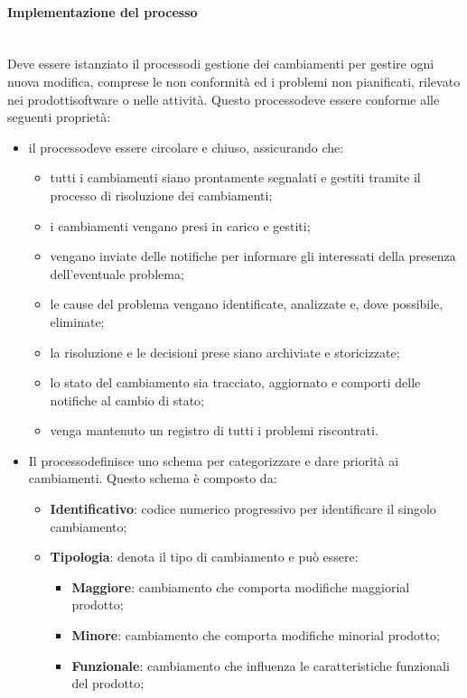 \paragraph{Implementazione del processo}\mbox{}\\ [1mm]
Deve essere istanziato il processo\glosp di gestione dei cambiamenti per gestire ogni nuova modifica, comprese le non conformità ed i problemi non pianificati, rilevato nei prodotti\glosp software o nelle attività. Questo processo\glosp deve essere conforme alle seguenti proprietà:
\begin{itemize}
	\item il processo\glosp deve essere circolare e chiuso, assicurando che:
	\begin{itemize} 
		\item tutti i cambiamenti siano prontamente segnalati e gestiti tramite il processo di risoluzione dei cambiamenti;
		\item i cambiamenti vengano presi in carico e gestiti;
		\item vengano inviate delle notifiche per informare gli interessati della presenza dell'eventuale problema;
		\item le cause del problema vengano identificate, analizzate e, dove possibile, eliminate;
		\item la risoluzione e le decisioni prese siano archiviate e storicizzate;
		\item lo stato del cambiamento sia tracciato, aggiornato e comporti delle notifiche al cambio di stato;
		\item venga mantenuto un registro di tutti i problemi riscontrati.
	\end{itemize}
	\item Il processo\glosp definisce uno schema per categorizzare e dare priorità ai cambiamenti. Questo schema è composto da:
	\begin{itemize} 
		\item \textbf{Identificativo}: codice numerico progressivo per identificare il singolo cambiamento;
		\item \textbf{Tipologia}: denota il tipo di cambiamento e può essere:
		\begin{itemize}
			\item \textbf{Maggiore}: cambiamento che comporta modifiche maggiori\glosp al prodotto\glo;
			\item \textbf{Minore}: cambiamento che comporta modifiche minori\glosp al prodotto\glo;
			\item \textbf{Funzionale}: cambiamento che influenza le caratteristiche funzionali del prodotto\glosp;

\end{itemize}
\end{itemize}
\end{itemize}
